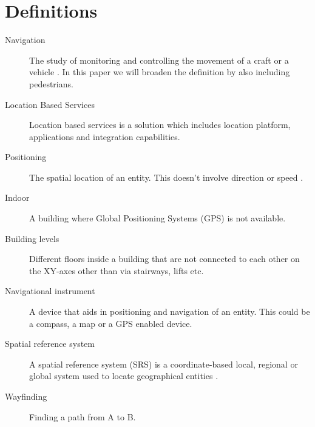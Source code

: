 \section{Definitions} %
\label{sec:definitions}

\begin{description}
	\item[Navigation] The study of monitoring and controlling the movement of a craft or a vehicle \cite{wiki_navi}. In this paper we will broaden the definition by also including pedestrians.

	\item[Location Based Services] Location based services is a solution which includes location platform, applications and integration capabilities.
	
	\item[Positioning] The spatial location of an entity. This doesn't involve direction or speed \cite{wiki_pos}.
	
	\item[Indoor] A building where Global Positioning Systems (GPS) is not available.
	
	\item[Building levels] Different floors inside a building that are not connected to each other on the XY-axes other than via stairways, lifts etc.
	
	\item[Navigational instrument] A device that aids in positioning and navigation of an entity. This could be a compass, a map or a GPS enabled device.
	
	
	\item[Spatial reference system] A spatial reference system (SRS) is a coordinate-based local, regional or global system used to locate geographical entities \cite{wiki_srs}.

	\item[Wayfinding]Finding a path from A to B.

\end{description}


